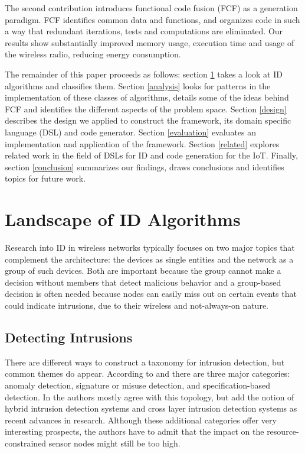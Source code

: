\documentclass[conference]{IEEEtran}
\begin{document}

The second contribution introduces functional code fusion (FCF) as a generation
paradigm. FCF identifies common data and functions, and organizes code in such
a way that redundant iterations, tests and computations are eliminated. Our
results show substantially improved memory usage, execution time and usage of
the wireless radio, reducing energy consumption.


The remainder of this paper proceeds as follows: section \ref{landscape} takes
a look at ID algorithms and classifies them. Section \ref{analysis} looks for
patterns in the implementation of these classes of algorithms, details some of
the ideas behind FCF and identifies the different aspects of the problem space.
Section \ref{design} describes the design we applied to construct the
framework, its domain specific language (DSL) and code generator. Section
\ref{evaluation} evaluates an implementation and application of the framework.
Section \ref{related} explores related work in the field of DSLs for ID and
code generation for the IoT. Finally, section \ref{conclusion} summarizes our
findings, draws conclusions and identifies topics for future work.

\section{Landscape of ID Algorithms}
\label{landscape}

Research into ID in wireless networks typically focuses on two major topics
that complement the architecture: the devices as single entities and the
network as a group of such devices. Both are important because the group cannot
make a decision without members that detect malicious behavior and a
group-based decision is often needed because nodes can easily miss out on
certain events that could indicate intrusions, due to their wireless and
not-always-on nature.

\subsection{Detecting Intrusions}
\label{subsection:detecting}

There are different ways to construct a taxonomy for intrusion detection, but
common themes do appear. According to \cite{mishra2004intrusion} and
\cite{ioannis2007towards} there are three major categories: anomaly detection,
signature or misuse detection, and specification-based detection. In
\cite{alrajeh2013intrusion} the authors mostly agree with this topology, but
add the notion of hybrid intrusion detection systems and cross layer intrusion
detection systems as recent advances in research. Although these additional
categories offer very interesting prospects, the authors have to admit that the
impact on the resource-constrained sensor nodes might still be too high.
\end{document}
